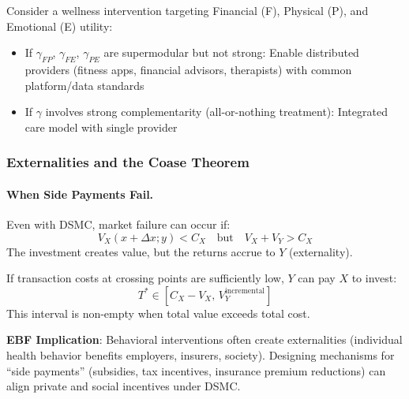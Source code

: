 \begin{example}
Consider a wellness intervention targeting Financial (F), Physical (P), and 
Emotional (E) utility:
\begin{itemize}
    \item If $\gamma_{FP}$, $\gamma_{FE}$, $\gamma_{PE}$ are supermodular but 
    not strong: Enable distributed providers (fitness apps, financial advisors, 
    therapists) with common platform/data standards
    \item If $\gamma$ involves strong complementarity (all-or-nothing treatment): 
    Integrated care model with single provider
\end{itemize}
\end{example}

\subsubsection{Externalities and the Coase Theorem}

\paragraph{When Side Payments Fail.}

Even with DSMC, market failure can occur if:
\begin{equation}
V_X(x + \Delta x; y) < C_X \quad \text{but} \quad V_X + V_Y > C_X
\end{equation}
The investment creates value, but the returns accrue to $Y$ (externality).

\begin{proposition}
\label{prop:coase}
If transaction costs at crossing points are sufficiently low, $Y$ can pay $X$ 
to invest:
\begin{equation}
T^* \in [C_X - V_X, \, V_Y^{\text{incremental}}]
\end{equation}
This interval is non-empty when total value exceeds total cost.
\end{proposition}

\textbf{EBF Implication}: Behavioral interventions often create externalities 
(individual health behavior benefits employers, insurers, society). Designing 
mechanisms for ``side payments'' (subsidies, tax incentives, insurance premium 
reductions) can align private and social incentives under DSMC.

